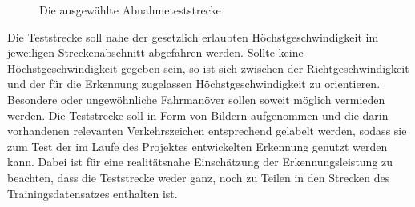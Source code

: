 \documentclass[12pt,a4paper,ngerman,enabledeprecatedfontcommands,landscape]{scrreprt}
\begin{document}
\begin{figure}[H]
\centering
{}
\caption{Die ausgewählte Abnahmeteststrecke}
\end{figure}

Die Teststrecke soll nahe der gesetzlich erlaubten Höchstgeschwindigkeit im jeweiligen Streckenabschnitt abgefahren werden. Sollte keine Höchstgeschwindigkeit gegeben sein, so ist sich zwischen der Richtgeschwindigkeit und der für die Erkennung zugelassen Höchstgeschwindigkeit zu orientieren. Besondere oder ungewöhnliche Fahrmanöver sollen soweit möglich vermieden werden.
Die Teststrecke soll in Form von Bildern aufgenommen und die darin vorhandenen relevanten Verkehrszeichen entsprechend gelabelt werden, sodass sie zum Test der im Laufe des Projektes entwickelten Erkennung genutzt werden kann. Dabei ist für eine realitätsnahe Einschätzung der Erkennungsleistung zu beachten, dass die Teststrecke weder ganz, noch zu Teilen in den Strecken des Trainingsdatensatzes enthalten ist.
\end{document}
